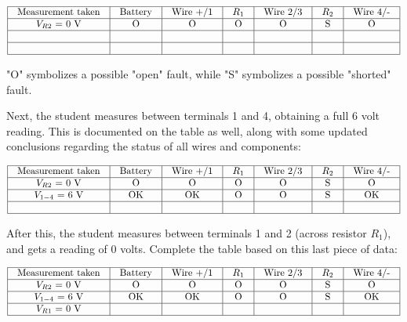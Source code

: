 
$$\vbox{\offinterlineskip
\halign{\strut
\vrule \quad\hfil # \ \hfil & 
\vrule \quad\hfil # \ \hfil & 
\vrule \quad\hfil # \ \hfil & 
\vrule \quad\hfil # \ \hfil & 
\vrule \quad\hfil # \ \hfil & 
\vrule \quad\hfil # \ \hfil & 
\vrule \quad\hfil # \ \hfil \vrule \cr
\noalign{\hrule}
%
Measurement taken & Battery & Wire +/1 & $R_1$ & Wire 2/3 & $R_2$ & Wire 4/- \cr
%
\noalign{\hrule}
%
$V_{R2}$ = 0 V & O & O & O & O & S & O \cr
%
\noalign{\hrule}
%
  &  &  &  &  &  &  \cr
%
\noalign{\hrule}
%
  &  &  &  &  &  &  \cr
%
\noalign{\hrule}
} %
}$$ %

"O" symbolizes a possible "open" fault, while "S" symbolizes a possible "shorted" fault.

\vskip 10pt

Next, the student measures between terminals 1 and 4, obtaining a full 6 volt reading.  This is documented on the table as well, along with some updated conclusions regarding the status of all wires and components:


$$\vbox{\offinterlineskip
\halign{\strut
\vrule \quad\hfil # \ \hfil & 
\vrule \quad\hfil # \ \hfil & 
\vrule \quad\hfil # \ \hfil & 
\vrule \quad\hfil # \ \hfil & 
\vrule \quad\hfil # \ \hfil & 
\vrule \quad\hfil # \ \hfil & 
\vrule \quad\hfil # \ \hfil \vrule \cr
\noalign{\hrule}
%
Measurement taken & Battery & Wire +/1 & $R_1$ & Wire 2/3 & $R_2$ & Wire 4/- \cr
%
\noalign{\hrule}
%
$V_{R2}$ = 0 V & O & O & O & O & S & O \cr
%
\noalign{\hrule}
%
$V_{1-4}$ = 6 V & OK & OK & O & O & S & OK \cr
%
\noalign{\hrule}
%
  &  &  &  &  &  &  \cr
%
\noalign{\hrule}
} %
}$$ %

\vskip 10pt

After this, the student measures between terminals 1 and 2 (across resistor $R_1$), and gets a reading of 0 volts.  Complete the table based on this last piece of data:


$$\vbox{\offinterlineskip
\halign{\strut
\vrule \quad\hfil # \ \hfil & 
\vrule \quad\hfil # \ \hfil & 
\vrule \quad\hfil # \ \hfil & 
\vrule \quad\hfil # \ \hfil & 
\vrule \quad\hfil # \ \hfil & 
\vrule \quad\hfil # \ \hfil & 
\vrule \quad\hfil # \ \hfil \vrule \cr
\noalign{\hrule}
%
Measurement taken & Battery & Wire +/1 & $R_1$ & Wire 2/3 & $R_2$ & Wire 4/- \cr
%
\noalign{\hrule}
%
$V_{R2}$ = 0 V & O & O & O & O & S & O \cr
%
\noalign{\hrule}
%
$V_{1-4}$ = 6 V & OK & OK & O & O & S & OK \cr
%
\noalign{\hrule}
%
$V_{R1}$ = 0 V &  &  &  &  &  &  \cr
%
\noalign{\hrule}
} %
}$$ %


